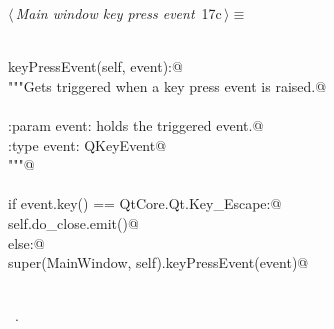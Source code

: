 \documentclass[
    a4paper,      %
    10pt,         %
    openright,    %
    notitlepage,  %
    parskip=half, %
]{scrreprt}       %
\theoremstyle{definition}                    %
\begin{document}
\begin{flushleft} \small
\begin{minipage}{\linewidth}\label{scrap10}\raggedright\small
{} $\langle\,${\itshape Main window key press event}\nobreak\ {\footnotesize {17c}}$\,\rangle\equiv$
\vspace{-1ex}
\begin{list}{}{} \item
\mbox{}\lstinline@@\\
\mbox{}\lstinline@def keyPressEvent(self, event):@\\
\mbox{}\lstinline@    """Gets triggered when a key press event is raised.@\\
\mbox{}\lstinline@@\\
\mbox{}\lstinline@    :param event: holds the triggered event.@\\
\mbox{}\lstinline@    :type  event: QKeyEvent@\\
\mbox{}\lstinline@    """@\\
\mbox{}\lstinline@@\\
\mbox{}\lstinline@    if event.key() == QtCore.Qt.Key_Escape:@\\
\mbox{}\lstinline@        self.do_close.emit()@\\
\mbox{}\lstinline@    else:@\\
\mbox{}\lstinline@        super(MainWindow, self).keyPressEvent(event)@\\
\mbox{}\lstinline@@\\
\mbox{}\lstinline@@{\NWsep}
\end{list}
\vspace{-1.5ex}
\footnotesize
\begin{list}{}{\setlength{\itemsep}{-\parsep}\setlength{\itemindent}{-\leftmargin}}
\item \NWtxtMacroRefIn\ .

\item{}
\end{list}
\end{minipage}\vspace{4ex}
\end{flushleft}
\end{document}
